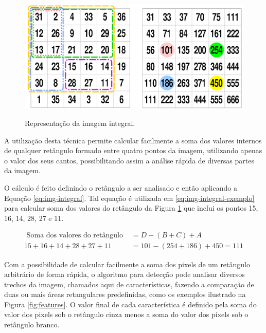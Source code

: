 \begin{figure}[htpb]
    \centering
    \caption{Representação da imagem integral.}
    \includegraphics[scale=.3]{figs/imagem-integral.png}
    \label{fig:integral}
\end{figure}

A utilização desta técnica permite calcular facilmente a soma dos valores internos de qualquer retângulo formado entre quatro pontos da imagem, utilizando apenas o valor dos seus cantos, possibilitando assim a análise rápida de diversas partes da imagem.

O cálculo é feito definindo o retângulo a ser analisado e então aplicando a Equação \ref{eq:img-integral}. Tal equação é utilizada em \ref{eq:img-integral-exemplo} para calcular soma dos valores do retângulo da Figura \ref{fig:integral} que inclui os pontos 15, 16, 14, 28, 27 e 11.

\begin{align}\label{eq:img-integral}
    \text{ Soma dos valores do retângulo } & = D - (B + C) + A               \\
    \label{eq:img-integral-exemplo}
    15 + 16 + 14 + 28 + 27 + 11            & = 101 - (254 + 186) + 450 = 111
\end{align}

Com a possibilidade de calcular facilmente a soma dos pixels de um retângulo arbitrário de forma rápida, o algoritmo para detecção pode analisar diversos trechos da imagem, chamados aqui de características, fazendo a comparação de duas ou mais áreas retangulares predefinidas, como os exemplos ilustrado na Figura \ref{fig:features}. O valor final de cada característica é definido pela soma do valor dos pixels sob o retângulo cinza menos a soma do valor dos pixels sob o retângulo branco.

